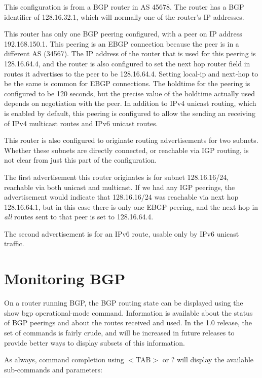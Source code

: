 This configuration is from a BGP router in AS 45678.  The router has a
BGP identifier of 128.16.32.1, which will normally one of the router's
IP addresses.

This router has only one BGP peering configured, with a peer on IP
address 192.168.150.1.  This peering is an EBGP connection because
the peer is in a different AS (34567).  The IP address of the router
that is used for this peering is 128.16.64.4, and the router is also
configured to set the next hop router field in routes it advertises to
the peer to be 128.16.64.4.  Setting local-ip and next-hop to be the
same is common for EBGP connections.  The holdtime for the peering is
configured to be 120 seconds, but the precise value of the holdtime
actually used depends on negotiation with the peer.  In addition to
IPv4 unicast routing, which is enabled by default, this peering is
configured to allow the sending an receiving of IPv4 multicast routes
and IPv6 unicast routes.

This router is also configured to originate routing advertisements for
two subnets.  Whether these subnets are directly connected, or
reachable via IGP routing, is not clear from just this part of the
configuration.  

The first advertisement this router originates is for subnet
128.16.16/24, reachable via both unicast and multicast.  If we had any
IGP peerings, the advertisement would indicate that 128.16.16/24 was
reachable via next hop 128.16.64.1, but in this case there is only one
EBGP peering, and the next hop in {\it all} routes sent to that peer
is set to 128.16.64.4.

The second advertisement is for an IPv6 route, usable only by IPv6
unicast traffic.

\newpage
\section{Monitoring BGP}

On a router running BGP, the BGP routing state can be displayed using
the {\stt show bgp} operational-mode command.  Information is available
about the status of BGP peerings and about the routes received and
used.  In the 1.0 release, the set of commands is fairly crude, and
will be increased in future releases to provide better ways to display
subsets of this information.

As always, command completion using $<$TAB$>$ or ? will display the
available sub-commands and parameters:

